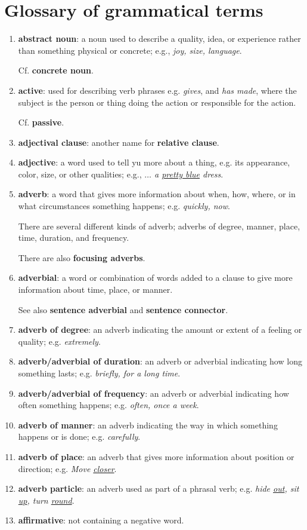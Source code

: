 \documentclass[oneside]{book}
\numberwithin{equation}{section}
\begin{document}
\section{Glossary of grammatical terms}
\begin{enumerate}
    \item \textbf{abstract noun}: a noun used to describe a quality, idea, or experience rather than something physical or concrete; e.g., \textit{joy, size, language}.
    
    Cf. \textbf{concrete noun}.
    \item \textbf{active}: used for describing verb phrases e.g. \textit{gives}, and \textit{has made}, where the subject is the person or thing doing the action or responsible for the action.
    
    Cf. \textbf{passive}.
    \item \textbf{adjectival clause}: another name for \textbf{relative clause}.
    \item \textbf{adjective}: a word used to tell yu more about a thing, e.g. its appearance, color, size, or other qualities; e.g., \textit{$\ldots$ a \underline{pretty blue} dress}.
    \item \textbf{adverb}: a word that gives more information about when, how, where, or in what circumstances something happens; e.g. \textit{quickly, now}.
    
    There are several different kinds of adverb; adverbs of degree, manner, place, time, duration, and frequency.
    
    There are also \textbf{focusing adverbs}.
    \item \textbf{adverbial}: a word or combination of words added to a clause to give more information about time, place, or manner.
    
    See also \textbf{sentence adverbial} and \textbf{sentence connector}.
    \item \textbf{adverb of degree}: an adverb indicating the amount or extent of a feeling or quality; e.g. \textit{extremely}.
    \item \textbf{adverb/adverbial of duration}: an adverb or adverbial indicating how long something lasts; e.g. \textit{briefly, for a long time}.
    \item \textbf{adverb/adverbial of frequency}: an adverb or adverbial indicating how often something happens; e.g. \textit{often, once a week}.
    \item \textbf{adverb of manner}: an adverb indicating the way in which something happens or is done; e.g. \textit{carefully}.
    \item \textbf{adverb of place}: an adverb that gives more information about position or direction; e.g. \textit{Move \underline{closer}}.
    \item \textbf{adverb particle}: an adverb used as part of a phrasal verb; e.g. \textit{hide \underline{out}, sit \underline{up}, turn \underline{round}}.
    \item \textbf{affirmative}: not containing a negative word.
    

\end{enumerate}
\end{document}
